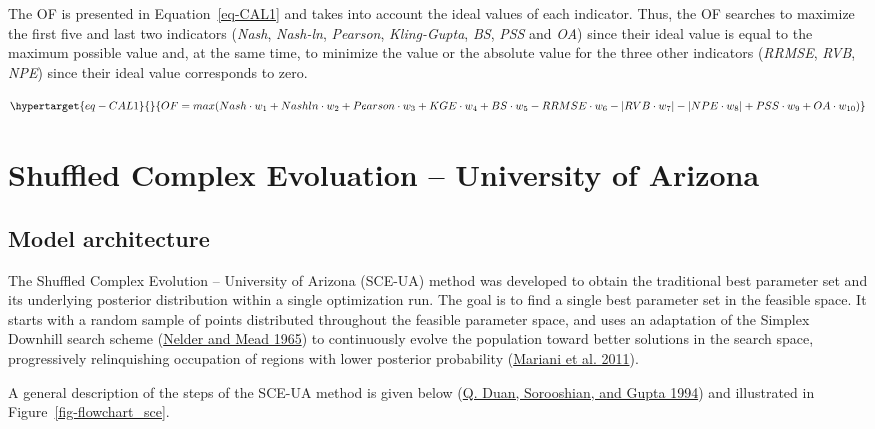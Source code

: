 \documentclass[
  letterpaper,
  DIV=11,
  numbers=noendperiod]{scrreprt}
\begin{document}
The OF is presented in Equation~\ref{eq-CAL1} and takes into account the
ideal values of each indicator. Thus, the OF searches to maximize the
first five and last two indicators (\emph{Nash}, \emph{Nash-ln},
\emph{Pearson}, \emph{Kling-Gupta}, \emph{BS}, \emph{PSS} and \emph{OA})
since their ideal value is equal to the maximum possible value and, at
the same time, to minimize the value or the absolute value for the three
other indicators (\emph{RRMSE}, \emph{RVB}, \emph{NPE}) since their
ideal value corresponds to zero.

\begin{equation}\protect\hypertarget{eq-CAL1}{}{
OF = max(Nash \cdot w_{1} + Nashln \cdot w_{2} + Pearson \cdot w_{3} + KGE \cdot w_{4} + BS \cdot w_{5} - RRMSE \cdot w_{6} - \left| RVB \cdot w_{7} \right| - \left| NPE \cdot w_{8} \right| + PSS \cdot w_{9} + OA \cdot w_{10})
}\label{eq-CAL1}\end{equation}

\hypertarget{sec-tech_calibration_algorithms_sce_ua}{%
\chapter{Shuffled Complex Evoluation -- University of
Arizona}\label{sec-tech_calibration_algorithms_sce_ua}}

\hypertarget{model-architecture}{%
\section{Model architecture}\label{model-architecture}}

The Shuffled Complex Evolution -- University of Arizona (SCE-UA) method
was developed to obtain the traditional best parameter set and its
underlying posterior distribution within a single optimization run. The
goal is to find a single best parameter set in the feasible space. It
starts with a random sample of points distributed throughout the
feasible parameter space, and uses an adaptation of the Simplex Downhill
search scheme (\protect\hyperlink{ref-nelder_simplex_1965}{Nelder and
Mead 1965}) to continuously evolve the population toward better
solutions in the search space, progressively relinquishing occupation of
regions with lower posterior probability
(\protect\hyperlink{ref-mariani_hybrid_2011}{Mariani et al. 2011}).

A general description of the steps of the SCE-UA method is given below
(\protect\hyperlink{ref-duan_optimal_1994}{Q. Duan, Sorooshian, and
Gupta 1994}) and illustrated in Figure~\ref{fig-flowchart_sce}.
\end{document}

